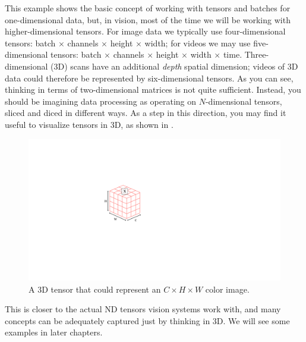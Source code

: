 This example shows the basic concept of working with tensors and batches for one-dimensional data, but, in vision, most of the time we will be working with higher-dimensional tensors. For image data we typically use four-dimensional tensors: batch $\times$ channels $\times$ height $\times$ width; for videos we may use five-dimensional tensors: batch $\times$ channels $\times$ height $\times$ width $\times$ time. Three-dimensional (3D) scans have an additional \textit{depth} spatial dimension; videos of 3D data could therefore be represented by six-dimensional tensors. As you can see, thinking in terms of two-dimensional matrices is not quite sufficient. Instead, you should be imagining data processing as operating on $N$-dimensional tensors, sliced and diced in different ways. As a step in this direction, you may find it useful to visualize tensors in 3D, as shown in \fig{\ref{fig:neural_nets:3D_tensor_example}}.
\begin{figure}[h]
\centerline{
\includegraphics[width=0.2\linewidth]{figures/neural_nets/3D_tensor_example.pdf}
}
\caption{A 3D tensor that could represent an $C \times H \times W$ color image.}
\label{fig:neural_nets:3D_tensor_example}
\end{figure}

This is closer to the actual ND tensors vision systems work with, and many concepts can be adequately captured just by thinking in 3D. We will see some examples in later chapters.


